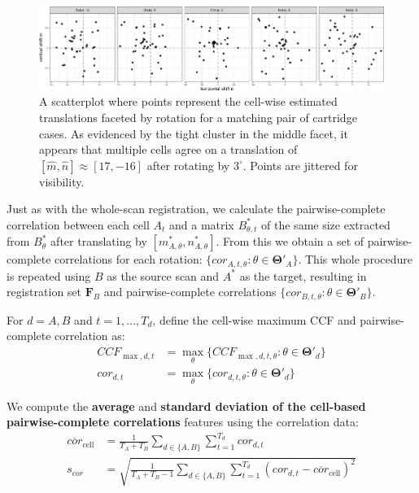 \documentclass[
]{jdssv}
\begin{document}
\begin{CodeChunk}
\begin{figure}[htbp]

{\centering \includegraphics[width=\textwidth]{figures/estimatedTranslationFaceted} 

}

\caption{\label{fig:estimatedTranslationFaceted} A scatterplot where points represent the cell-wise estimated translations faceted by rotation for a matching pair of cartridge cases. As evidenced by the tight cluster in the middle facet, it appears that multiple cells agree on a translation of $[\hat{m}, \hat{n}] \approx  [17,-16]$ after rotating by $3^\circ$. Points are jittered for visibility.}\label{fig:unnamed-chunk-10}
\end{figure}
\end{CodeChunk}

Just as with the whole-scan registration, we calculate the
pairwise-complete correlation between each cell \(A_t\) and a matrix
\(B_{\theta,t}^*\) of the same size extracted from \(B^*_{\theta}\)
after translating by \([m^*_{A,\theta},n^*_{A,\theta}]\). From this we
obtain a set of pairwise-complete correlations for each rotation:
\(\{cor_{A,t,\theta} : \theta \in \pmb{\Theta}'_A\}\). This whole
procedure is repeated using \(B\) as the source scan and \(A^*\) as the
target, resulting in registration set \(\pmb{F}_B\) and
pairwise-complete correlations
\(\{cor_{B,t,\theta} : \theta \in \pmb{\Theta}'_B\}\).

For \(d = A,B\) and \(t = 1,...,T_d\), define the cell-wise maximum CCF
and pairwise-complete correlation as: \begin{align*}
CCF_{\max,d,t} &= \max_{\theta} \{CCF_{\max,d,t,\theta} : \theta \in \pmb{\Theta}'_d\} \\
cor_{d,t} &= \max_{\theta} \{cor_{d,t,\theta} : \theta \in \pmb{\Theta}'_d\}
\end{align*}

We compute the \textbf{average} and
\textbf{standard deviation of the cell-based pairwise-complete correlations}
features using the correlation data: \begin{align*}
\overline{cor}_{\text{cell}} &= \frac{1}{T_A + T_B} \sum_{d \in \{A,B\}} \sum_{t=1}^{T_d} cor_{d,t} \\
s_{cor} &= \sqrt{\frac{1}{T_A + T_B - 1} \sum_{d \in \{A,B\}} \sum_{t=1}^{T_d} (cor_{d,t} - \overline{cor}_{\text{cell}})^2}
\end{align*}
\end{document}

